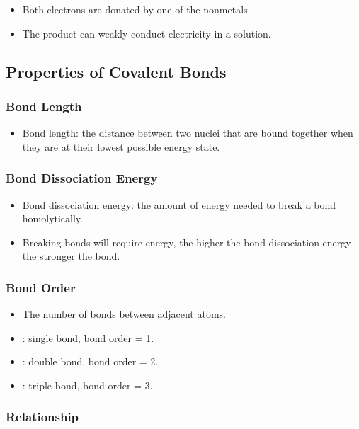 \documentclass{article}
\begin{document}
\begin{itemize}
    \item Both electrons are donated by one of the nonmetals.
    \item The product can weakly conduct electricity in a solution.
\end{itemize}

\subsection{Properties of Covalent Bonds}

\subsubsection{Bond Length}

\begin{itemize}
    \item Bond length: the distance between two nuclei that are bound together when they are at their lowest possible energy state.
\end{itemize}

\subsubsection{Bond Dissociation Energy}

\begin{itemize}
    \item Bond dissociation energy: the amount of energy needed to break a bond homolytically.
    \item Breaking bonds will require energy, the higher the bond dissociation energy the stronger the bond.
\end{itemize}

\subsubsection{Bond Order}

\begin{itemize}
    \item The number of bonds between adjacent atoms.
    \item {}: single bond, bond order = 1.
    \item {}: double bond, bond order = 2.
    \item {}: triple bond, bond order = 3.
\end{itemize}

\subsubsection{Relationship}
\end{document}
